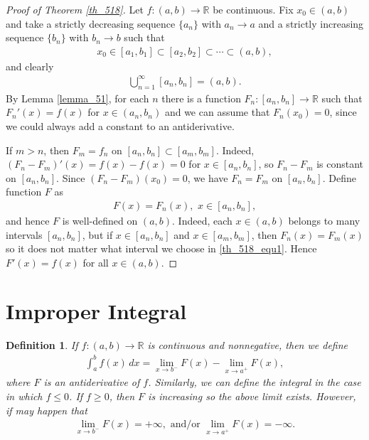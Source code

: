 \documentclass[10pt]{book}
\newtheorem{definition}{Definition}[chapter]
\theoremstyle{definition}
\numberwithin{equation}{chapter}
\begin{document}
\begin{proof}[Proof of Theorem \ref{th_518}]
Let $f: (a,b) \to \mathbb{R}$ be continuous. Fix $x_0 \in (a,b)$ and take a strictly decreasing sequence $\{a_n\}$ with $a_n \to a$ and a strictly increasing sequence $\{b_n\}$ with $b_n \to b$ such that 
\begin{align*}
    x_0 \in [a_1,b_1] \subset [a_2,b_2] \subset \cdots \subset (a,b),
\end{align*}
and clearly 
\begin{align*}
    \bigcup^\infty_{n=1} [a_n,b_n] = (a,b).
\end{align*}
By Lemma \ref{lemma_51}, for each $n$ there is a function $F_n: [a_n,b_n] \to \mathbb{R}$ such that $F_n'(x) = f(x)$ for $x \in (a_n,b_n)$ and we can assume that $F_n(x_0) = 0$, since we could always add a constant to an antiderivative.

If $m > n$, then $F_m = f_n$ on $[a_n,b_n] \subset [a_m,b_m]$. Indeed, $(F_n - F_m)'(x) = f(x) - f(x) = 0$ for $x \in [a_n,b_n]$, so $F_n - F_m$ is constant on $[a_n,b_n]$. Since $(F_n - F_m)(x_0) = 0$, we have $F_n = F_m$ on $[a_n,b_n]$. Define function $F$ as
\begin{align}\label{th_518_equ1}
    F(x) = F_n(x), \,\, x \in [a_n,b_n],
\end{align}
and hence $F$ is well-defined on $(a,b)$. Indeed, each $x \in (a,b)$ belongs to many intervals $[a_n,b_n]$, but if $x \in [a_n,b_n]$ and $x \in [a_m,b_m]$, then $F_n(x) = F_m(x)$ so it does not matter what interval we choose in \eqref{th_518_equ1}. Hence $F'(x) = f(x)$ for all $x \in (a,b)$.
\end{proof}


\medskip



\section{Improper Integral}

\begin{definition}
If $f: (a,b) \to \mathbb{R}$ is continuous and nonnegative, then we define
\begin{align*}
    \int^b_a f(x) \,dx = \lim_{x \to b^-} F(x) - \lim_{x \to a^+} F(x),
\end{align*}
where $F$ is an antiderivative of $f$. Similarly, we can define the integral in the case in which $f \leq 0$. If $f \geq 0$, then $F$ is increasing so the above limit exists. However, if may happen that 
\begin{align*}
    \lim_{x \to b^-} F(x) = + \infty, \,\, \text{and/or} \,\, \lim_{x \to a^+} F(x) = -\infty.
\end{align*}
\end{definition}
\end{document}
